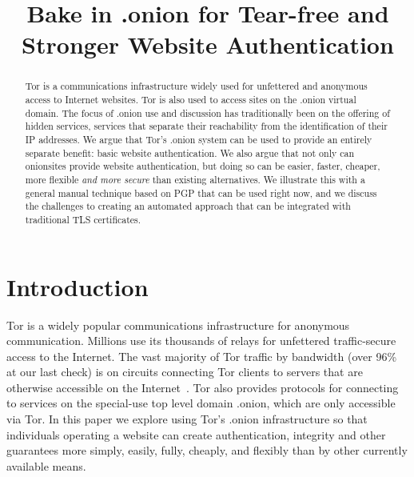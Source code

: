 \documentclass[10pt, conference, compsocconf]{styles/IEEEtran}
\title{Bake in .onion for Tear-free and Stronger Website Authentication}
\author{
\IEEEauthorblockN{Paul Syverson}
\IEEEauthorblockA{U.S. Naval Research Laboratory\\
paul.syverson@nrl.navy.mil}
\and
\IEEEauthorblockN{Griffin Boyce}
\IEEEauthorblockA{Berkman Center for Internet and Society\\
griffin@cryptolab.net}
}
\begin{document}
\maketitle

\begin{abstract}
  Tor is a communications infrastructure widely used for unfettered
  and anonymous access to Internet websites. Tor is also used to
  access sites on the .onion virtual domain.  The focus of .onion use
  and discussion has traditionally been on the offering of hidden
  services, services that separate their reachability from the
  identification of their IP addresses. We argue that Tor's .onion
  system can be used to provide an entirely separate benefit: basic
  website authentication. We also argue that not only can onionsites
  provide website authentication, but doing so can be easier, faster,
  cheaper, more flexible \emph{and more secure} than existing alternatives.
  We illustrate this with a general manual technique based on PGP
  that can be used right now, and we discuss the challenges to
  creating an automated approach that can be integrated with
  traditional TLS certificates.
\end{abstract}

% 
% 
% 
% 
% 
% 
% 
% 
% 
% 
% 

\section{Introduction}
Tor is a widely popular communications infrastructure for anonymous
communication. Millions use its thousands of relays for unfettered
traffic-secure access to the Internet. The vast majority of Tor
traffic by bandwidth (over 96\% at our last check) is on circuits
connecting Tor clients to servers that are otherwise
accessible on the Internet~\cite{hs-stats-report-2015}. Tor
also provides protocols for connecting to services on the
special-use top level domain .onion, which are only accessible via Tor.
In this paper we explore using Tor's .onion infrastructure so that
individuals operating a website can create authentication, integrity
and other guarantees more simply, easily, fully, cheaply, and flexibly
than by other currently available means.
\end{document}
